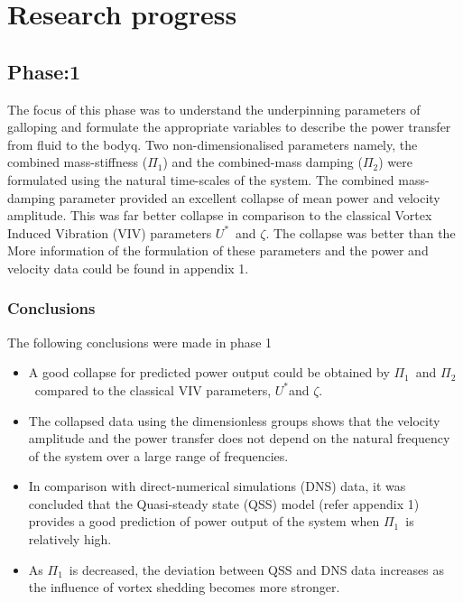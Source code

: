 \documentclass[authoryear,12pt]{article}
\newcommand{\ustar}{\ensuremath{U^{*}}}
\newcommand{\massstiff}{\ensuremath{\Pi_1}}
\newcommand{\massdamp}{\ensuremath{\Pi_2}}
\begin{document}
\clearpage

\section{Research progress}

\subsection{Phase:1}
 
The focus of this phase was to understand the underpinning parameters of galloping and formulate the appropriate variables to describe the power transfer from fluid to the bodyq. Two non-dimensionalised parameters namely, the combined mass-stiffness (\massstiff) and the combined-mass damping (\massdamp) were formulated using the natural time-scales of the system. The combined mass-damping parameter provided an excellent collapse of mean power and velocity amplitude. This was far better collapse in comparison to the classical Vortex Induced Vibration (VIV) parameters \ustar \ and $\zeta$. The collapse was better than the  More information of the formulation of these parameters and the power and velocity data could be found in appendix 1.    

\subsubsection*{Conclusions}

The following conclusions were made in phase 1 

\begin{itemize}
\item  A good collapse for predicted power output could be obtained by \massstiff \ and \massdamp \ compared to the classical VIV parameters, \ustar and $\zeta$. 

\item The collapsed data using the dimensionless groups shows that the velocity amplitude and the power transfer does not depend on the natural frequency of the system over a large range of frequencies. 

\item In comparison with direct-numerical simulations (DNS) data, it was concluded that the Quasi-steady state (QSS) model (refer appendix 1) provides a good prediction of power output of the system when \massstiff \ is relatively high.   

\item As \massstiff \ is decreased, the deviation between QSS and DNS data increases as the influence of vortex shedding becomes more stronger.   
\end{itemize}
\end{document}
